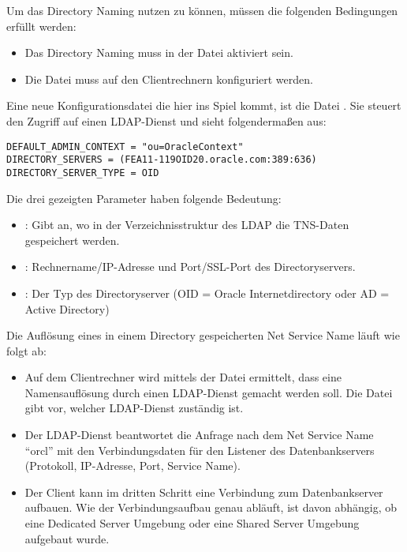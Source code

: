        Um das Directory Naming nutzen zu k\"onnen, m\"ussen die folgenden Bedingungen erf\"ullt werden:
\clearpage
        \begin{itemize}
          \item Das Directory Naming muss in der Datei  aktiviert sein.
          \item Die Datei  muss auf den Clientrechnern konfiguriert werden.
        \end{itemize}
        Eine neue Konfigurationsdatei die hier ins Spiel kommt, ist die Datei . Sie steuert den Zugriff auf einen LDAP-Dienst und sieht folgenderma\ss{}en aus:
        \begin{lstlisting}[caption={Die Datei ldap.ora},label=admin612,language=configfile]
DEFAULT_ADMIN_CONTEXT = "ou=OracleContext"
DIRECTORY_SERVERS = (FEA11-119OID20.oracle.com:389:636)
DIRECTORY_SERVER_TYPE = OID
        \end{lstlisting}
        Die drei gezeigten Parameter haben folgende Bedeutung:
        \begin{itemize}
          \item {}: Gibt an, wo in der Verzeichnisstruktur des LDAP die TNS-Daten gespeichert werden.
          \item {}: Rechnername/IP-Adresse und Port/SSL-Port des Directoryservers.
          \item {}: Der Typ des Directoryserver (OID = Oracle Internetdirectory oder AD = Active Directory)
        \end{itemize}

        Die Aufl\"osung eines in einem Directory gespeicherten Net Service Name l\"auft wie folgt ab:


        \begin{itemize}
          \item Auf dem Clientrechner wird mittels der Datei  ermittelt, dass eine Namensaufl\"osung durch einen LDAP-Dienst gemacht werden soll. Die Datei  gibt vor, welcher LDAP-Dienst zust\"andig ist.
          \item Der LDAP-Dienst beantwortet die Anfrage nach dem Net Service Name \enquote{orcl} mit den Verbindungsdaten f\"ur den Listener des Datenbankservers (Protokoll, IP-Adresse, Port, Service Name).
          \item Der Client kann im dritten Schritt eine Verbindung zum Datenbankserver aufbauen. Wie der Verbindungsaufbau genau abl\"auft, ist davon abh\"angig, ob eine Dedicated Server Umgebung oder eine Shared Server Umgebung aufgebaut wurde.
        \end{itemize}
